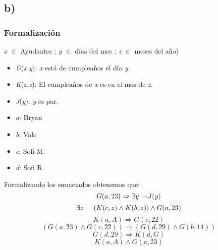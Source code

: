 \documentclass[letterpaper,10pt]{article}
\begin{document}
\subsection*{b)}

\subsubsection*{Formalizaci\'on}
\begin{minipage}[t]{0.6\textwidth}
    \textit{x} \(\in\) Ayudantes ; \textit{y} \(\in\) d\'ias del mes ; \textit{z} \(\in\) meses del año)
\begin{itemize}
    \item \textit{G}(\textit{x},\textit{y}): \textit{x} est\'a de cumpleaños el d\'ia \textit{y}.
    \item \textit{K}(\textit{x},\textit{z}): El cumpleaños de \textit{x} es en el mes de \textit{z}.
    \item \textit{J}(\textit{y}): \textit{y} es par.
    \item \textit{a}: Bryan
    \item \textit{b}: Vale
    \item \textit{c}: Sofi M.
    \item \textit{d}: Sofi R.
\end{itemize}
\end{minipage}
\begin{minipage}[t]{0.48\textwidth}
\hspace{3mm}Formalizando los enunciados obtenemos que:
\begin{equation}
    G(a,23) \Rightarrow \exists y \hspace{2mm} \neg J(y)
\end{equation}
\begin{equation}
    \exists z \hspace{5mm} (K(c,z) \wedge K(b,z)) \wedge G(a,23)
\end{equation}
\begin{equation}
    K(a,A) \Rightarrow G(c,22)
\end{equation}
\begin{equation}
    (G(a,23) \wedge G(c, 22)) \Rightarrow (G(d,29) \wedge G(b,14))
\end{equation}
\begin{equation}
    G(d,29) \Rightarrow K(d,G)
\end{equation}
\begin{equation}
    K(a,A) \wedge G(a,23)
\end{equation}
\end{minipage}
\end{document}
